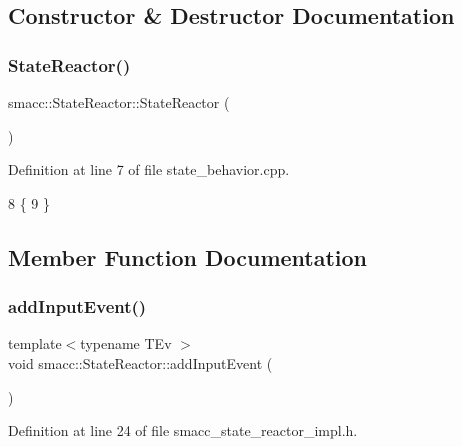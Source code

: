\subsection{Constructor \& Destructor Documentation}
\mbox{\label{classsmacc_1_1StateReactor_ae319e9f7b0a2a80b4c5ace6ec8c99fb2}} 
\subsubsection{\texorpdfstring{State\+Reactor()}{StateReactor()}}
{\footnotesize\ttfamily smacc\+::\+State\+Reactor\+::\+State\+Reactor (\begin{DoxyParamCaption}{ }\end{DoxyParamCaption})}



Definition at line 7 of file state\+\_\+behavior.\+cpp.


\begin{DoxyCode}
8 \{
9 \}
\end{DoxyCode}


\subsection{Member Function Documentation}
\mbox{\label{classsmacc_1_1StateReactor_acd4b35b4c82241fc27bb858761f6e4de}} 
\subsubsection{\texorpdfstring{add\+Input\+Event()}{addInputEvent()}}
{\footnotesize\ttfamily template$<$typename T\+Ev $>$ \\
void smacc\+::\+State\+Reactor\+::add\+Input\+Event (\begin{DoxyParamCaption}{ }\end{DoxyParamCaption})}



Definition at line 24 of file smacc\+\_\+state\+\_\+reactor\+\_\+impl.\+h.



